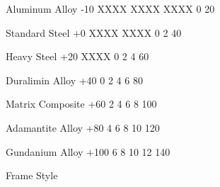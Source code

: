 \documentclass[twoside]{book}
\begin{document}
                      
                       Aluminum Alloy   
                       -10%
                       XXXX   
                       XXXX   
                       XXXX   
                       0   
                       20   
                      
                      
                       Standard Steel   
                       +0%
                       XXXX   
                       XXXX   
                       0   
                       2   
                       40   
                      
                      
                       Heavy Steel   
                       +20%
                       XXXX   
                       0   
                       2   
                       4   
                       60   
                      
                      
                       Duralimin Alloy   
                       +40%
                       0   
                       2   
                       4   
                       6   
                       80   
                      
                      
                       Matrix Composite   
                       +60%
                       2   
                       4   
                       6   
                       8   
                       100   
                      
                      
                       Adamantite Alloy   
                       +80%
                       4   
                       6   
                       8   
                       10   
                       120   
                      
                      
                       Gundanium Alloy   
                       +100%
                       6   
                       8   
                       10   
                       12   
                       140   
                      
                    
                  Frame Style  
                  
\end{document}
